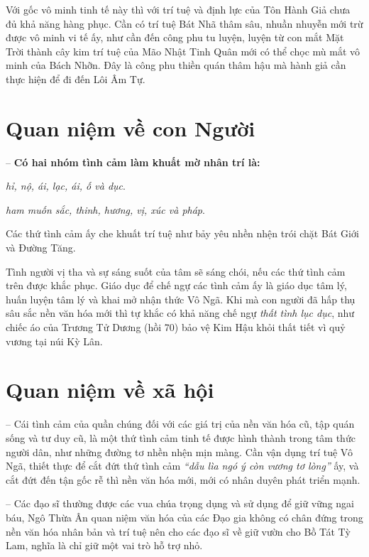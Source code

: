Với gốc vô minh tinh tế này thì với trí tuệ và định lực của Tôn Hành Giả chưa đủ khả năng hàng phục. Cần có trí tuệ Bát Nhã thâm sâu, nhuần nhuyễn mới trừ được vô minh vi tế ấy, như cần đến công phu tu luyện, luyện từ con mắt Mặt Trời thành cây kim trí tuệ của Mão Nhật Tinh Quân mới có thể chọc mù mắt vô minh của Bách Nhỡn. Đây là công phu thiền quán thâm hậu mà hành giả cần thực hiện để đi đến Lôi Âm Tự.

\section{Quan niệm về con Người} %
\label{sec:72_73_con_nguoi}

-- {\bf Có hai nhóm tình cảm làm khuất mờ nhân trí là:}

\begin{description}[leftmargin=!,labelwidth=\widthof{\bfseries Thất tình:}]
    \item[Thất tình:] \emph{hỉ, nộ, ái, lạc, ái, ố và dục}.

    \item[Lục dục:] \emph{ham muốn sắc, thinh, hương, vị, xúc và pháp}.
\end{description}

Các thứ tình cảm ấy che khuất trí tuệ như bảy yêu nhền nhện trói chặt Bát Giới và Đường Tăng.

Tình người vị tha và sự sáng suốt của tâm sẽ sáng chói, nếu các thứ tình cảm trên được khắc phục. Giáo dục để chế ngự các tình cảm ấy là giáo dục tâm lý, huấn luyện tâm lý và khai mở nhận thức Vô Ngã. Khi mà con người đã hấp thụ sâu sắc nền văn hóa mới thì tự khắc có khả năng chế ngự \emph{thất tình lục dục}, như chiếc áo của Trương Tử Dương (hồi 70) bảo vệ Kim Hậu khỏi thất tiết vì quỷ vương tại núi Kỳ Lân.

\section{Quan niệm về xã hội} %
\label{sec:72_73_xa_hoi}

-- Cái tình cảm của quần chúng đối với các giá trị của nền văn hóa cũ, tập quán sống và tư duy cũ, là một thứ tình cảm tinh tế được hình thành trong tâm thức người dân, như những đường tơ nhền nhện mịn màng. Cần vận dụng trí tuệ Vô Ngã, thiết thực để cắt đứt thứ tình cảm \emph{``dẫu lìa ngó ý còn vương tơ lòng''} ấy, và cắt đứt đến tận gốc rễ thì nền văn hóa mới, mới có nhân duyên phát triển mạnh.

-- Các đạo sĩ thường được các vua chúa trọng dụng và sử dụng để giữ vững ngai báu, Ngô Thừa Ân quan niệm văn hóa của các Đạo gia không có chân đứng trong nền văn hóa nhân bản và trí tuệ nên cho các đạo sĩ về giữ vườn cho Bồ Tát Tỳ Lam, nghĩa là chỉ giữ một vai trò hỗ trợ nhỏ.
